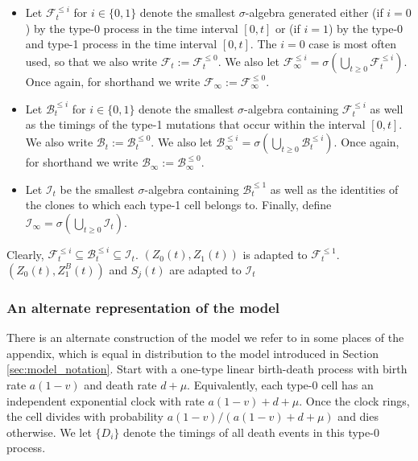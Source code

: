 \documentclass{article}
\numberwithin{equation}{section}
\begin{document}
\begin{itemize}
    \item Let $\mathcal{F}_t^{\leq i}$ for $i\in \{0,1\}$ denote the smallest $\sigma$-algebra generated either (if $i=0$) by the type-0 process in the time interval $[0,t]$ or (if $i=1$) by the type-0 and type-1 process in the time interval $[0,t]$. The $i=0$ case is most often used, so that we also write $\mathcal{F}_t:=\mathcal{F}_t^{\leq 0}$. We also let $\mathcal{F}_\infty^{\leq i}=\sigma\left(\bigcup_{t\geq 0}\mathcal{F}_t^{\leq i}\right)$. Once again, for shorthand we write $\mathcal{F}_\infty:=\mathcal{F}_\infty^{\leq 0}$.
    \item Let $\mathcal{B}_t^{\leq i}$ for $i\in \{0,1\}$ denote the smallest $\sigma$-algebra containing $\mathcal{F}_t^{\leq i}$ as well as the timings of the type-1 mutations that occur within the interval $[0,t]$. We also write $\mathcal{B}_t:=\mathcal{B}_t^{\leq0}$. We also let $\mathcal{B}_\infty^{\leq i}=\sigma\left(\bigcup_{t\geq 0}\mathcal{B}_t^{\leq i}\right)$. Once again, for shorthand we write $\mathcal{B}_\infty:=\mathcal{B}_\infty^{\leq 0}$.
    \item Let $\mathcal{I}_t$ be the smallest $\sigma$-algebra containing $\mathcal{B}_t^{\leq 1}$ as well as the identities of the clones to which each type-1 cell belongs to. Finally, define $\mathcal{I}_\infty=\sigma\left(\bigcup_{t\geq 0}\mathcal{I}_t\right)$.
\end{itemize}

Clearly, $\mathcal{F}_t^{\leq i}\subseteq \mathcal{B}_t^{\leq i}\subseteq \mathcal{I}_t$. $(Z_0(t),Z_1(t))$ is adapted to $\mathcal{F}_t^{\leq 1}$. $(Z_0(t),Z_1^B(t))$ and $S_j(t)$ are adapted to $\mathcal{I}_t$

\subsubsection{An alternate representation of the model}\label{app:alt_representation_model}

There is an alternate construction of the model we refer to in some places of the appendix, which is equal in distribution to the model introduced in Section \ref{sec:model_notation}. Start with a one-type linear birth-death process with birth rate $a(1-v)$ and death rate $d+\mu$. Equivalently, each type-0 cell has an independent exponential clock with rate $a(1-v)+d+\mu$. Once the clock rings, the cell divides with probability $a(1-v)/(a(1-v)+d+\mu)$ and dies otherwise. We let $\{D_i\}$ denote the timings of all death events in this type-0 process.
\end{document}
